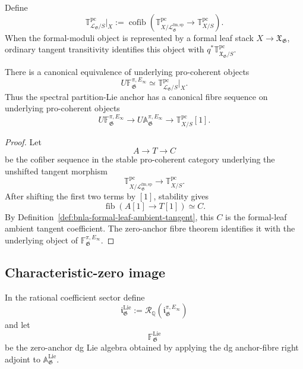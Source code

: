 \begin{definition}
\label{def:bnla-formal-leaf-ambient-tangent}
Define
\[
\boxed{
    \mathbb T^{\mathrm{pc}}_{\mathcal L_{\mathfrak G}/S}\big|_X
    :=
    \operatorname{cofib}
    \left(
        \mathbb T^{\mathrm{pc}}_{X/\mathcal L^{\mathrm{fm,sp}}_{\mathfrak G}}
        \longrightarrow
        \mathbb T^{\mathrm{pc}}_{X/S}
    \right).}
\]
When the formal-moduli object is represented by a formal leaf stack
$X\to\mathfrak X_{\mathfrak G}$, ordinary tangent transitivity identifies
this object with
$q^*\mathbb T^{\mathrm{pc}}_{\mathfrak X_{\mathfrak G}/S}$.
\end{definition}

\begin{proposition}
\label{prop:bnla-spectral-anchor-fibre-transitivity}
There is a canonical equivalence of underlying pro-coherent objects
\[
\boxed{
    U\mathbb F^{\pi,E_\infty}_{\mathfrak G}
    \simeq
    \mathbb T^{\mathrm{pc}}_{\mathcal L_{\mathfrak G}/S}\big|_X.}
\]
Thus the spectral partition-Lie anchor has a canonical fibre sequence on
underlying pro-coherent objects
\[
\boxed{
    U\mathbb F^{\pi,E_\infty}_{\mathfrak G}
    \longrightarrow
    U\mathbb A^{\pi,E_\infty}_{\mathfrak G}
    \longrightarrow
    \mathbb T^{\mathrm{pc}}_{X/S}[1].}
\]
\end{proposition}

\begin{proof}
Let
\[
    A\longrightarrow T\longrightarrow C
\]
be the cofiber sequence in the stable pro-coherent category underlying the
unshifted tangent morphism
\[
    \mathbb T^{\mathrm{pc}}_{X/\mathcal L^{\mathrm{fm,sp}}_{\mathfrak G}}
    \longrightarrow
    \mathbb T^{\mathrm{pc}}_{X/S}.
\]
After shifting the first two terms by $[1]$, stability gives
\[
    \operatorname{fib}(A[1]\to T[1])\simeq C.
\]
By Definition~\ref{def:bnla-formal-leaf-ambient-tangent}, this $C$ is the
formal-leaf ambient tangent coefficient.  The zero-anchor fibre theorem
identifies it with the underlying object of
$\mathbb F^{\pi,E_\infty}_{\mathfrak G}$.
\end{proof}

\subsection{Characteristic-zero image}

In the rational coefficient sector define
\[
    \mathfrak i^{\mathrm{Lie}}_{\mathfrak G}
    :=
    \mathcal R_{\mathbb Q}
    \left(
        \mathfrak i^{\pi,E_\infty}_{\mathfrak G}
    \right)
\]
and let
\[
    \mathbb F^{\mathrm{Lie}}_{\mathfrak G}
\]
be the zero-anchor dg Lie algebra obtained by applying the dg anchor-fibre
right adjoint to $\mathbb A^{\mathrm{Lie}}_{\mathfrak G}$.


